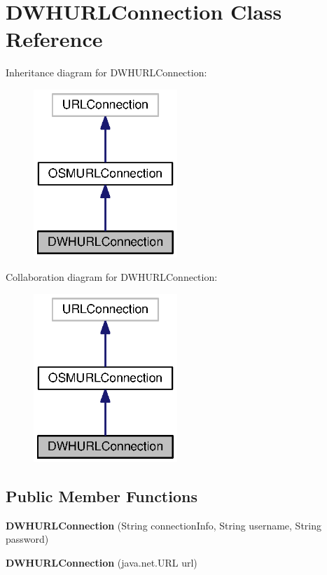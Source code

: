 \section{D\+W\+H\+U\+R\+L\+Connection Class Reference}
\label{classorg_1_1smallfoot_1_1parser_1_1ocidwh_1_1DWHURLConnection}


Inheritance diagram for D\+W\+H\+U\+R\+L\+Connection\+:\nopagebreak
\begin{figure}[H]
\begin{center}
\leavevmode
\includegraphics[width=154pt]{classorg_1_1smallfoot_1_1parser_1_1ocidwh_1_1DWHURLConnection__inherit__graph}
\end{center}
\end{figure}


Collaboration diagram for D\+W\+H\+U\+R\+L\+Connection\+:\nopagebreak
\begin{figure}[H]
\begin{center}
\leavevmode
\includegraphics[width=154pt]{classorg_1_1smallfoot_1_1parser_1_1ocidwh_1_1DWHURLConnection__coll__graph}
\end{center}
\end{figure}
\subsection*{Public Member Functions}
\begin{DoxyCompactItemize}
\item 
{\bf D\+W\+H\+U\+R\+L\+Connection} (String connection\+Info, String username, String password)
\item 
{\bf D\+W\+H\+U\+R\+L\+Connection} (java.\+net.\+U\+R\+L url)
\end{DoxyCompactItemize}
